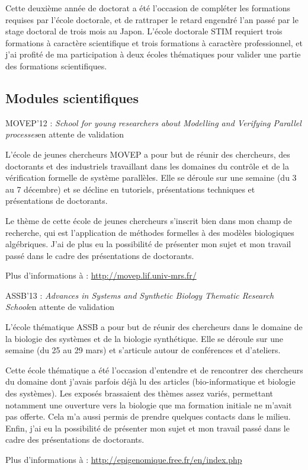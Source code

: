Cette deuxième année de doctorat a été l'occasion de compléter les formations requises par l'école doctorale,
et de rattraper le retard engendré l'an passé par le stage doctoral de trois mois au Japon.
L'école doctorale STIM requiert trois formations à caractère scientifique et trois formations à caractère professionnel,
et j'ai profité de ma participation à deux écoles thématiques pour valider une partie des formations scientifiques.

\subsection{Modules scientifiques}

\formation
{MOVEP'12 : \textit{School for young researchers about Modelling and Verifying Parallel processes}}{en attente de validation}
{L'école de jeunes chercheurs MOVEP a pour but de réunir des chercheurs, des doctorants et des industriels travaillant dans les domaines du contrôle et de la vérification formelle de système parallèles. Elle se déroule sur une semaine (du 3 au 7 décembre) et se décline en tutoriels, présentations techniques et présentations de doctorants.

Le thème de cette école de jeunes chercheurs s'inscrit bien dans mon champ de recherche, qui est l'application de méthodes formelles à des modèles biologiques algébriques. J'ai de plus eu la possibilité de présenter mon sujet et mon travail passé dans le cadre des présentations de doctorants.

Plus d'informations à : \url{http://movep.lif.univ-mrs.fr/}}

\formation
{ASSB'13 : \textit{Advances in Systems and Synthetic Biology Thematic Research School}}{en attente de validation}
{L'école thématique ASSB a pour but de réunir des chercheurs dans le domaine de la biologie des systèmes et de la biologie synthétique. Elle se déroule sur une semaine (du 25 au 29 mars) et s'articule autour de conférences et d'ateliers.

Cette école thématique a été l'occasion d'entendre et de rencontrer des chercheurs du domaine dont j'avais parfois déjà lu des articles (bio-informatique et biologie des systèmes). Les exposés brassaient des thèmes assez variés, permettant notamment une ouverture vers la biologie que ma formation initiale ne m'avait pas offerte. Cela m'a aussi permis de prendre quelques contacts dans le milieu. Enfin, j'ai eu la possibilité de présenter mon sujet et mon travail passé dans le cadre des présentations de doctorants.

Plus d'informations à : \url{http://epigenomique.free.fr/en/index.php}}

